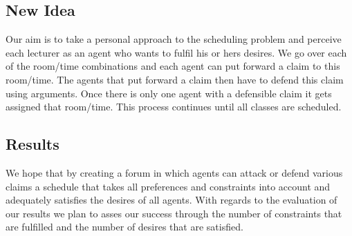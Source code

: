 \documentclass[a4paper]{article}
\begin{document}
\subsection*{New Idea}
Our aim is to take a personal approach to the scheduling problem and perceive each lecturer as an agent who wants to fulfil his or hers desires. We go over each of the room/time combinations and each agent can put forward a claim to this room/time. The agents that put forward a claim then have to defend this claim using arguments. Once there is only one agent with a defensible claim it gets assigned that room/time. This process continues until all classes are scheduled. 


\subsection*{Results}
We hope that by creating a forum in which agents can attack or defend various claims a schedule that takes all preferences and constraints into account and adequately satisfies the desires of all agents. With regards to the evaluation of our results we plan to asses our success through the number of constraints that are fulfilled and the number of desires that are satisfied.



\end{document}
